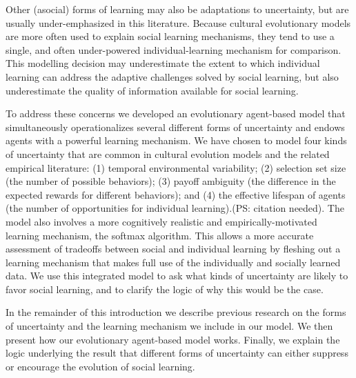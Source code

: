 \documentclass[letterpaper,11.5pt]{scrartcl}
\newcommand{\ps}[1]{{\textcolor{mygreen} {({\tiny PS:} #1)}}}
\begin{document}
Other (asocial) forms of learning may also be adaptations to uncertainty, but are usually under-emphasized in this literature. Because cultural evolutionary models are more often used to explain social learning mechanisms, they tend to use a single, and often under-powered individual-learning mechanism for comparison. This modelling decision may underestimate the extent to which individual learning can address the adaptive challenges solved by social learning, but also underestimate the quality of information available for social learning.

To address these concerns we developed an evolutionary agent-based model that simultaneously operationalizes several
different forms of uncertainty and endows agents with a powerful learning mechanism. We have chosen to model four kinds of uncertainty that are common in cultural evolution models and the related empirical literature:  (1) temporal environmental variability; (2) selection set size (the number of possible behaviors); (3) payoff ambiguity (the difference in the expected rewards for different behaviors); and (4) the effective lifespan of agents (the number of opportunities for individual learning).\ps{citation needed}. The model also involves a more cognitively realistic and empirically-motivated learning mechanism, the softmax algorithm. This allows a more accurate assessment of tradeoffs between social and individual learning by fleshing out a learning mechanism that makes full use of the individually and socially learned data. We use this integrated model to ask what kinds of uncertainty are likely to favor social learning, and to clarify the logic of why this would be the case.  

In the remainder of this introduction we describe previous research on the forms of uncertainty and the learning mechanism we include in our model. We then present how our evolutionary agent-based model works. Finally, we explain the logic underlying the result that different forms of uncertainty can either suppress or encourage the evolution of social learning. 
\end{document}
